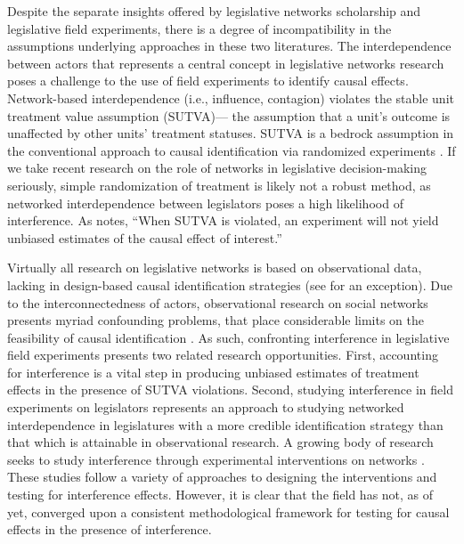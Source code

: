\documentclass[12pt]{article}
\begin{document}
Despite the separate insights offered by legislative networks scholarship and legislative field experiments, there is a degree of incompatibility in the assumptions underlying approaches in these two literatures. The interdependence between actors that represents a central concept in legislative networks research poses a challenge to the use of field experiments to identify causal effects. Network-based interdependence (i.e., influence, contagion) violates the stable unit treatment value assumption (SUTVA)--- the assumption that a unit's outcome is unaffected by other units' treatment statuses. SUTVA is a bedrock assumption in the conventional approach to causal identification via randomized experiments \citep{sekhon2008}.  If we take recent research on the role of networks in legislative decision-making seriously, simple randomization of treatment is likely not a robust method, as networked interdependence between legislators poses a high likelihood of interference.  As \citet[p. 5]{sekhon2008} notes, ``When SUTVA is violated, an experiment will not yield unbiased estimates of the causal effect of interest.''  

Virtually all research on legislative networks is based on observational data, lacking in design-based causal identification strategies (see \citet{rogowski2012estimating} for an exception). Due to the interconnectedness of actors, observational research on social networks presents myriad confounding problems, that place considerable limits on the feasibility of causal identification \citep{Shalizi:2011}. As such, confronting interference in legislative field experiments presents two related research opportunities. First, accounting for interference is a vital step in producing unbiased estimates of treatment effects in the presence of SUTVA violations. Second, studying interference in field experiments on legislators represents an approach to studying networked interdependence in legislatures with a more credible identification strategy than that which is attainable in observational research. A growing body of research seeks to study interference through experimental interventions on networks \citep[e.g., ][]{gerber2008,paluck2011,Bond:2012,muchnik2013,aral2014,bapna2015,Ben-AaronPAR}. These studies follow a variety of approaches to designing the interventions and testing for interference effects. However, it is clear that the field has not, as of yet, converged upon a consistent methodological framework for testing for causal effects in the presence of interference. 
\end{document}
